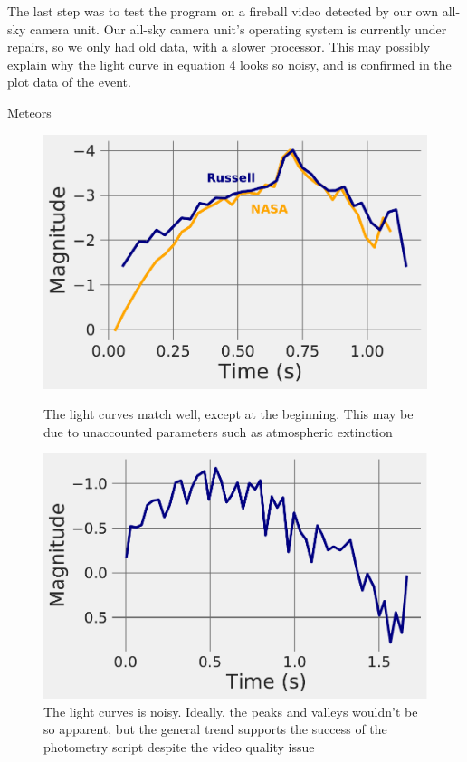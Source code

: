 \documentclass[final]{beamer}
\newlength{\onecolwid}
\begin{document}
\begin{frame}[t]
\begin{columns}[t]
\begin{column}{\onecolwid}
\vspace{-1.5cm}
\begin{block}{}
The last step was to test the program on a fireball video detected by our own all-sky camera unit. Our all-sky camera unit's operating system is currently under repairs, so we only had old data, with a slower processor. This may possibly explain why the light curve in equation 4 looks so noisy, and is confirmed in the plot data of the event.
\end{block}

\begin{alertblock}{Meteors}

\begin{figure}
\includegraphics[width=.8\linewidth]{LightComparison0.pdf}
\caption{The light curves match well, except at the beginning. This may be due to unaccounted parameters such as atmospheric extinction}

\vspace{0cm}

\includegraphics[width=.8\linewidth]{D6Curve.pdf}
\caption{The light curves is noisy. Ideally, the peaks and valleys wouldn't be so apparent, but the general trend supports the success of the photometry script despite the video quality issue}
\end{figure}


\end{alertblock}
\end{column}
\end{columns}
\end{frame}
\end{document}
